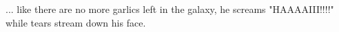 \documentclass{article}
\begin{document}
... like there are no more garlics left in the galaxy, he screams "HAAAAIII!!!!" while tears stream down his face. 
\end{document}
